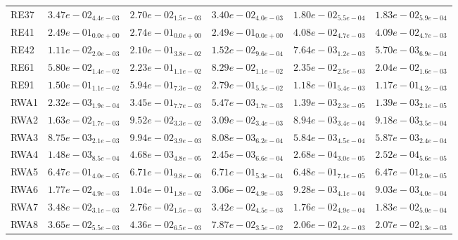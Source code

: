 \documentclass{article}
\begin{document}
\begin{table}
\begin{scriptsize}
\begin{tabular}{llllll}
RE37 & $  3.47e-02_{ 4.4e-03}$ & $  2.70e-02_{ 1.5e-03}$ & $  3.40e-02_{ 4.0e-03}$ & \cellcolor{gray95}$  1.80e-02_{ 5.5e-04}$ & \cellcolor{gray25}$  1.83e-02_{ 5.9e-04}$ \\
RE41 & $  2.49e-01_{ 0.0e+00}$ & $  2.74e-01_{ 0.0e+00}$ & $  2.49e-01_{ 0.0e+00}$ & \cellcolor{gray95}$  4.08e-02_{ 4.7e-03}$ & \cellcolor{gray25}$  4.09e-02_{ 4.7e-03}$ \\
RE42 & $  1.11e-02_{ 2.0e-03}$ & $  2.10e-01_{ 3.8e-02}$ & $  1.52e-02_{ 9.6e-04}$ & \cellcolor{gray25}$  7.64e-03_{ 1.2e-03}$ & \cellcolor{gray95}$  5.70e-03_{ 6.9e-04}$ \\
RE61 & $  5.80e-02_{ 1.4e-02}$ & $  2.23e-01_{ 1.1e-02}$ & $  8.29e-02_{ 1.1e-02}$ & \cellcolor{gray25}$  2.35e-02_{ 2.5e-03}$ & \cellcolor{gray95}$  2.04e-02_{ 1.6e-03}$ \\
RE91 & $  1.50e-01_{ 1.1e-02}$ & $  5.94e-01_{ 7.3e-02}$ & $  2.79e-01_{ 5.5e-02}$ & \cellcolor{gray25}$  1.18e-01_{ 5.4e-03}$ & \cellcolor{gray95}$  1.17e-01_{ 4.2e-03}$ \\
RWA1 & $  2.32e-03_{ 1.9e-04}$ & $  3.45e-01_{ 7.7e-03}$ & $  5.47e-03_{ 1.7e-03}$ & \cellcolor{gray95}$  1.39e-03_{ 2.3e-05}$ & \cellcolor{gray25}$  1.39e-03_{ 2.1e-05}$ \\
RWA2 & $  1.63e-02_{ 1.7e-03}$ & $  9.52e-02_{ 3.3e-02}$ & $  3.09e-02_{ 3.4e-03}$ & \cellcolor{gray95}$  8.94e-03_{ 3.4e-04}$ & \cellcolor{gray25}$  9.18e-03_{ 3.5e-04}$ \\
RWA3 & $  8.75e-03_{ 2.1e-03}$ & $  9.94e-02_{ 3.9e-03}$ & $  8.08e-03_{ 6.2e-04}$ & \cellcolor{gray95}$  5.84e-03_{ 4.5e-04}$ & \cellcolor{gray25}$  5.87e-03_{ 2.4e-04}$ \\
RWA4 & $  1.48e-03_{ 8.5e-04}$ & $  4.68e-03_{ 4.8e-05}$ & $  2.45e-03_{ 6.6e-04}$ & \cellcolor{gray25}$  2.68e-04_{ 3.0e-05}$ & \cellcolor{gray95}$  2.52e-04_{ 5.6e-05}$ \\
RWA5 & \cellcolor{gray25}$  6.47e-01_{ 4.0e-05}$ & $  6.71e-01_{ 9.8e-06}$ & $  6.71e-01_{ 5.3e-04}$ & $  6.48e-01_{ 7.1e-05}$ & \cellcolor{gray95}$  6.47e-01_{ 2.0e-05}$ \\
RWA6 & $  1.77e-02_{ 4.9e-03}$ & $  1.04e-01_{ 1.8e-02}$ & $  3.06e-02_{ 4.9e-03}$ & \cellcolor{gray25}$  9.28e-03_{ 4.1e-04}$ & \cellcolor{gray95}$  9.03e-03_{ 4.0e-04}$ \\
RWA7 & $  3.48e-02_{ 3.1e-03}$ & $  2.76e-02_{ 1.5e-03}$ & $  3.42e-02_{ 4.5e-03}$ & \cellcolor{gray95}$  1.76e-02_{ 4.9e-04}$ & \cellcolor{gray25}$  1.83e-02_{ 5.0e-04}$ \\
RWA8 & $  3.65e-02_{ 5.5e-03}$ & $  4.36e-02_{ 6.5e-03}$ & $  7.87e-02_{ 3.5e-02}$ & \cellcolor{gray95}$  2.06e-02_{ 1.2e-03}$ & \cellcolor{gray25}$  2.07e-02_{ 1.3e-03}$ \\

\end{tabular}
\end{scriptsize}
\end{table}
\end{document}
